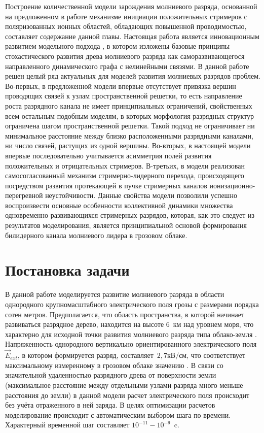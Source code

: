 Построение количественной модели зарождения молниевого разряда, основанной на предложенном в работе \cite{Iudin2017} механизме инициации положительных стримеров с поляризованных ионных областей, обладающих повышенной проводимостью, составляет содержание данной главы. Настоящая работа является инновационным развитием модельного подхода \cite{IudinRakov2017}, в котором изложены базовые принципы стохастического развития древа молниевого разряда как саморазвивающегося направленного динамического графа с нелинейными связями. В данной работе решен целый ряд актуальных для моделей развития молниевых разрядов проблем. Во-первых, в предложенной модели впервые отсутствует привязка вершин проводящих связей к узлам пространственной решетки, то есть направление роста разрядного канала не имеет принципиальных ограничений, свойственных всем остальным подобным моделям, в которых морфология разрядных структур ограничена шагом пространственной решетки. Такой подход не ограничивает ни минимальное расстояние между близко расположенными разрядными каналами, ни число связей, растущих из одной вершины. Во-вторых, в настоящей модели впервые последовательно учитывается асимметрия полей развития положительных и отрицательных стримеров. В-третьих, в модели реализован самосогласованный механизм стримерно-лидерного перехода, происходящего посредством развития протекающей в пучке стримерных каналов ионизационно-перегревной неустойчивости. Данные свойства модели позволили успешно воспроизвести основные особенности коллективной динамики множества одновременно развивающихся стримерных разрядов, которая, как это следует из результатов моделирования, является принципиальной основой формирования билидерного канала молниевого лидера в грозовом облаке.

\section{Постановка задачи}
\label{sec:model-base}
В данной работе моделируется развитие молниевого разряда в области однородного крупномасштабного электрического поля грозы с размерами порядка сотен метров. Предполагается, что область пространства, в которой начинает развиваться разрядное дерево, находится на высоте 6~км над уровнем моря, что характерно для исходной точки развития молниевого разряда типа облако-земля \cite{Rison2016}. Напряженность однородного вертикально ориентированного электрического поля $\vec E_{ext}$, в котором формируется разряд, составляет~$2,7 \text{кВ}/\text{см}$, что соответствует максимальному измеренному в грозовом облаке значению \cite{Marshall1995}. В связи со значительной удаленностью разрядного древа от поверхности земли (максимальное расстояние между отдельными узлами разряда много меньше расстояния до земли) в данной модели расчет электрического поля происходит без учёта отраженного в ней заряда. В целях оптимизации расчетов моделирование происходит с автоматическим выбором шага по времени. Характерный временной шаг составляет $10^{-11} - 10^{-9}$~c.

